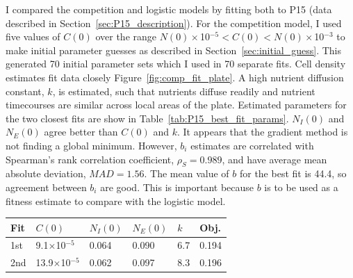 I compared the competition and logistic models by fitting both to P15
(data described in Section~\ref{sec:P15_description}). For the
competition model, I used five values of \(C(0)\) over the range
\(N(0)\times\)10\(^{-5} < C(0) < N(0)\times\)10\(^{-3}\) to make
initial parameter guesses as described in
Section~\ref{sec:initial_guess}. This generated 70 initial parameter
sets which I used in 70 separate fits. Cell density estimates fit data
closely Figure~\ref{fig:comp_fit_plate}.
A high nutrient diffusion constant, \(k\), is estimated, such that
nutrients diffuse readily and nutrient timecourses are similar across
local areas of the plate. Estimated parameters for the two closest
fits are show in Table~\ref{tab:P15_best_fit_params}. \(N_{I}(0)\) and
\(N_{E}(0)\) agree better than \(C(0)\) and \(k\). It appears that the
gradient method is not finding a global minimum. However, \(b_{i}\)
estimates are correlated with Spearman's rank correlation coefficient,
\(\rho_{S} = 0.989\), and have average mean absolute deviation,
\(MAD = 1.56\). The mean value of \(b\) for the best fit is 44.4, so
agreement between \(b_{i}\) are good. This is important because \(b\)
is to be used as a fitness estimate to compare with the logistic
model.
\begin{center}
  \begin{tabular}{l l l l l l}
    \hline
    Fit     & \(C(0)\)                    & \(N_{I}(0)\) & \(N_{E}(0)\) & \(k\) & Obj.\\
    \hline
    1st     & 9.1\(\times\)10\(^{-5}\)    & 0.064      & 0.090       & 6.7  & 0.194 \\
    2nd     & 13.9\(\times\)10\(^{-5}\)   & 0.062      & 0.097       & 8.3  & 0.196 \\
    \hline
  \end{tabular}
  \label{tab:P15_best_fit_params}
\end{center}

